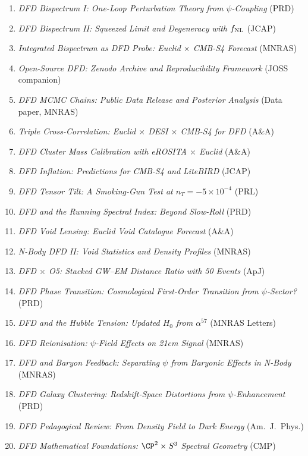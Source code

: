 \documentclass[11pt,a4paper]{article}
\begin{document}
\begin{enumerate}[nosep]
\item \textit{DFD Bispectrum I: One-Loop Perturbation Theory from $\psi$-Coupling} (PRD)
\item \textit{DFD Bispectrum II: Squeezed Limit and Degeneracy with $f_{\rm NL}$} (JCAP)
\item \textit{Integrated Bispectrum as DFD Probe: Euclid $\times$ CMB-S4 Forecast} (MNRAS)
\item \textit{Open-Source DFD: Zenodo Archive and Reproducibility Framework} (JOSS companion)
\item \textit{DFD MCMC Chains: Public Data Release and Posterior Analysis} (Data paper, MNRAS)
\item \textit{Triple Cross-Correlation: Euclid $\times$ DESI $\times$ CMB-S4 for DFD} (A\&A)
\item \textit{DFD Cluster Mass Calibration with eROSITA $\times$ Euclid} (A\&A)
\item \textit{DFD Inflation: Predictions for CMB-S4 and LiteBIRD} (JCAP)
\item \textit{DFD Tensor Tilt: A Smoking-Gun Test at $n_T = -5 \times 10^{-4}$} (PRL)
\item \textit{DFD and the Running Spectral Index: Beyond Slow-Roll} (PRD)
\item \textit{DFD Void Lensing: Euclid Void Catalogue Forecast} (A\&A)
\item \textit{N-Body DFD II: Void Statistics and Density Profiles} (MNRAS)
\item \textit{DFD $\times$ O5: Stacked GW--EM Distance Ratio with 50 Events} (ApJ)
\item \textit{DFD Phase Transition: Cosmological First-Order Transition from $\psi$-Sector?} (PRD)
\item \textit{DFD and the Hubble Tension: Updated $H_0$ from $\alpha^{57}$} (MNRAS Letters)
\item \textit{DFD Reionisation: $\psi$-Field Effects on 21cm Signal} (MNRAS)
\item \textit{DFD and Baryon Feedback: Separating $\psi$ from Baryonic Effects in N-Body} (MNRAS)
\item \textit{DFD Galaxy Clustering: Redshift-Space Distortions from $\psi$-Enhancement} (PRD)
\item \textit{DFD Pedagogical Review: From Density Field to Dark Energy} (Am.\ J.\ Phys.)
\item \textit{DFD Mathematical Foundations: $\CP^2 \times S^3$ Spectral Geometry} (CMP)
\end{enumerate}
\end{document}
